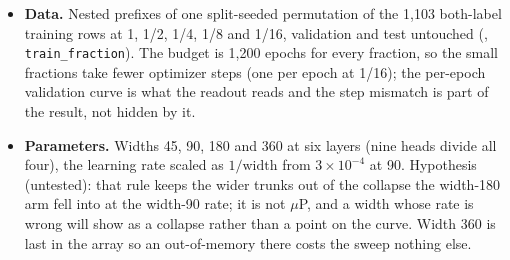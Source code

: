 \begin{itemize}[leftmargin=1.2em,itemsep=1pt,topsep=2pt]
\item \textbf{Data.} Nested prefixes of one split-seeded permutation of the 1{,}103
both-label training rows at 1, 1/2, 1/4, 1/8 and 1/16, validation and test untouched
(, \texttt{train\_fraction}). The budget is 1{,}200
epochs for every fraction, so the small fractions take fewer optimizer steps (one per
epoch at 1/16); the per-epoch validation curve is what the readout reads and the step
mismatch is part of the result, not hidden by it.
\item \textbf{Parameters.} Widths 45, 90, 180 and 360 at six layers (nine heads
divide all four), the learning rate scaled as $1/\text{width}$ from $3\times10^{-4}$
at 90. Hypothesis (untested): that rule keeps the wider trunks out of the collapse the
width-180 arm fell into at the width-90 rate; it is not $\mu$P, and a width whose
rate is wrong will show as a collapse rather than a point on the curve. Width 360 is
last in the array so an out-of-memory there costs the sweep nothing else.
\end{itemize}
